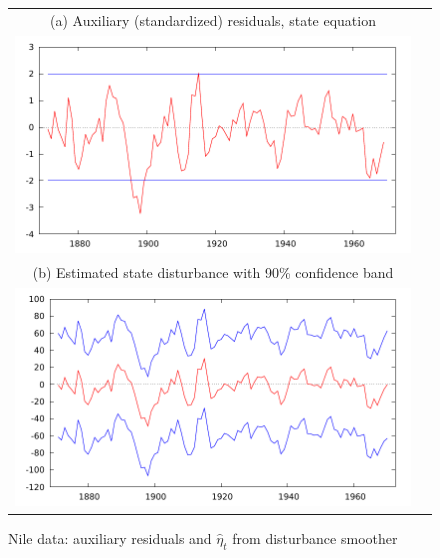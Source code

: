 \begin{figure}[htbp]
  \centering
  \begin{tabular}{cc}
  \small
  (a) Auxiliary (standardized) residuals, state equation \\
    \includegraphics{figures/nile_eta_ksd} \\[14pt]
  \small (b) Estimated state disturbance with 90\% confidence band \\
  \includegraphics{figures/nile_eta_dk}
  \end{tabular}
  \caption{Nile data: auxiliary residuals and $\hat{\eta}_t$
    from disturbance smoother}
  \label{fig:nile}
\end{figure}

